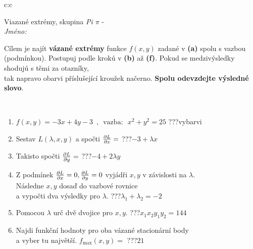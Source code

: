 \documentclass[10pt]{report}
\begin{document}
\begin{tabular}{c:c}
\begin{minipage}[c][104.5mm][t]{0.5\linewidth}
\begin{center}
\vspace{7mm}
{\huge Viazané extrémy, skupina \textit{Pi $\pi$} -}\\[5mm]
\textit{Jméno:}\phantom{xxxxxxxxxxxxxxxxxxxxxxxxxxxxxxxxxxxxxxxxxxxxxxxxxxxxxxxxxxxxxxxxx}\\[5mm]
\begin{minipage}{0.95\linewidth}
\begin{center}
Cílem je najít \textbf{vázané extrémy} funkce $f(x,y)$ zadané v \textbf{(a)} spolu s vazbou (podmínkou). Postupuj podle krokú v \textbf{(b)} až \textbf{(f)}. Pokud se medzivýsledky shodujú s těmi za otazníky,\\tak napravo obarvi příslušející kroužek načerno. \textbf{Spolu odevzdejte výsledné slovo}.
\end{center}
\end{minipage}
\\[1mm]
\begin{minipage}{0.79\linewidth}
\begin{center}
\begin{varwidth}{\linewidth}
\begin{enumerate}
\normalsize
\item $f(x,y)=-3x+4y-3 \enspace , \enspace \mathrm{vazba:} \enspace x^2+y^2=25$\quad \dotfill\; ???\;\dotfill \quad vybarvi
\item Sestav $L(\lambda,x,y)$ a spočti $\pdv{L}{x}=$\quad \dotfill\; ???\;\dotfill \quad $-3+\lambda x$
\item Takisto spočti $\pdv{L}{y}=$\quad \dotfill\; ???\;\dotfill \quad $-4+2\lambda y$
\item Z podmínek $\pdv{L}{x}=0 , \pdv{L}{y}=0$ vyjádři $x,y$ v závislosti na $\lambda$.\\ \phantom{xxxxxx}Následne $x,y$ dosaď do vazbové rovnice\\ \phantom{xxxxxx}a vypočti dva výsledky pro $\lambda$.\quad \dotfill\; ???\;\dotfill \quad $\lambda_1+\lambda_2=-2$
\item Pomocou $\lambda$ urč dvě dvojice pro $x,y$.\quad \dotfill\; ???\;\dotfill \quad $x_1 x_2 y_1 y_2=144$
\item Najdi funkční hodnoty pro oba vázané stacionární body\\ \phantom{xxxxxx}a vyber tu najvětší. $f_{\text{max}}(x,y)=$\quad \dotfill\; ???\;\dotfill \quad $21$

\end{enumerate}
\end{varwidth}
\end{center}
\end{minipage}
\end{center}
\end{minipage}
\end{tabular}
\end{document}
